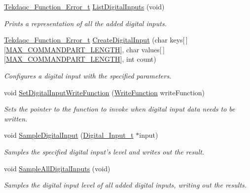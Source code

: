 \begin{DoxyCompactItemize}
\hyperlink{group__tekdaqc__error_ga19df05d919ecca7a7501b35ae9080a32}{Tekdaqc\-\_\-\-Function\-\_\-\-Error\-\_\-t} \hyperlink{group__digital__input_gaf5dbc88e9aa5cee34b35d908a2e61276}{List\-Digital\-Inputs} (void)
\begin{DoxyCompactList}\small\item\em Prints a representation of all the added digital inputs. \end{DoxyCompactList}\item 
\hyperlink{group__tekdaqc__error_ga19df05d919ecca7a7501b35ae9080a32}{Tekdaqc\-\_\-\-Function\-\_\-\-Error\-\_\-t} \hyperlink{group__digital__input_ga5b4bb29221f6aafe926340eafcf7f722}{Create\-Digital\-Input} (char keys\mbox{[}$\,$\mbox{]}\mbox{[}\hyperlink{group__command__parser_ga6147771b5547853f33eb838895e3d5a2}{M\-A\-X\-\_\-\-C\-O\-M\-M\-A\-N\-D\-P\-A\-R\-T\-\_\-\-L\-E\-N\-G\-T\-H}\mbox{]}, char values\mbox{[}$\,$\mbox{]}\mbox{[}\hyperlink{group__command__parser_ga6147771b5547853f33eb838895e3d5a2}{M\-A\-X\-\_\-\-C\-O\-M\-M\-A\-N\-D\-P\-A\-R\-T\-\_\-\-L\-E\-N\-G\-T\-H}\mbox{]}, int count)
\begin{DoxyCompactList}\small\item\em Configures a digital input with the specified parameters. \end{DoxyCompactList}\item 
void \hyperlink{group__digital__input_ga77861794e1f3432e96903fee5fe1bc2b}{Set\-Digital\-Input\-Write\-Function} (\hyperlink{group__tekdaqc__configuration_ga163b2a4cc55a569e988df48908631967}{Write\-Function} write\-Function)
\begin{DoxyCompactList}\small\item\em Sets the pointer to the function to invoke when digital input data needs to be written. \end{DoxyCompactList}\item 
void \hyperlink{group__digital__input_ga8c060a2a592e2644ffe8efdb198637f2}{Sample\-Digital\-Input} (\hyperlink{struct_digital___input__t}{Digital\-\_\-\-Input\-\_\-t} $\ast$input)
\begin{DoxyCompactList}\small\item\em Samples the specified digital input's level and writes out the result. \end{DoxyCompactList}\item 
void \hyperlink{group__digital__input_gaaa11463a9a8f8ae76ebd26ca8331e734}{Sample\-All\-Digital\-Inputs} (void)
\begin{DoxyCompactList}\small\item\em Samples the digital input level of all added digital inputs, writing out the results. \end{DoxyCompactList}\item 

\end{DoxyCompactItemize}
